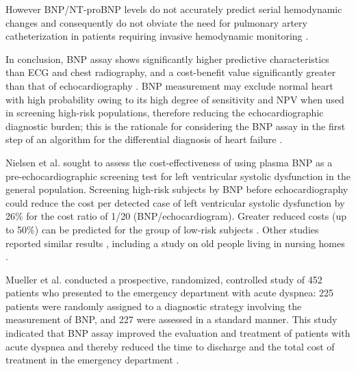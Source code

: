 \documentclass[14pt,a4paper,onecolumn]{extarticle}
\begin{document}
However BNP/NT-proBNP levels do not accurately predict serial hemodynamic changes and consequently do not obviate the need for pulmonary artery catheterization in patients requiring invasive hemodynamic monitoring \citep{bib3183}.

In conclusion, BNP assay shows significantly higher predictive characteristics than ECG and chest radiography, and a cost-benefit value significantly greater than that of echocardiography \citep{bib392} \citep{bib3170}. BNP measurement may exclude normal heart with high probability owing to its high degree of sensitivity and NPV when used in screening high-risk populations, therefore reducing the echocardiographic diagnostic burden; this is the rationale for considering the BNP assay in the first step of an algorithm for the differential diagnosis of heart failure \citep{bib337} \citep{bib365} \citep{bib369} \citep{bib370} \citep{bib3168} \citep{bib3175}.

Nielsen et al. \citep{bib392} sought to assess the cost-effectiveness of using plasma BNP as a pre-echocardiographic screening test for left ventricular systolic dysfunction in the general population. Screening high-risk subjects by BNP before echocardiography could reduce the cost per detected case of left ventricular systolic dysfunction by 26\% for the cost ratio of 1/20 (BNP/echocardiogram). Greater reduced costs (up to 50\%) can be predicted for the group of low-risk subjects \citep{bib392}. Other studies reported similar results \citep{bib393} \citep{bib3145}, including a study on old people living in nursing homes \citep{bib3147}.

Mueller et al. conducted a prospective, randomized, controlled study of 452 patients who presented to the emergency department with acute dyspnea: 225 patients were randomly assigned to a diagnostic strategy involving the measurement of BNP, and 227 were assessed in a standard manner. This study indicated that BNP assay improved the evaluation and treatment of patients with acute dyspnea and thereby reduced the time to discharge and the total cost of treatment in the emergency department \citep{Mueller2004}.
\end{document}

